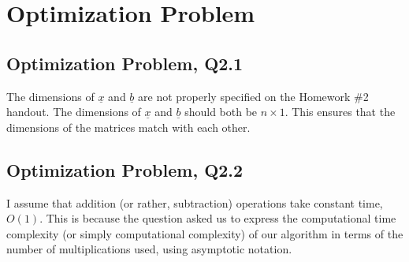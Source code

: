 \documentclass[letter,12pt]{article}
\begin{document}
\section{Optimization Problem}
\label{sec:optimizationproblem}

\subsection{Optimization Problem, Q2.1}
\label{ssec:q2a}

The dimensions of $\underline{x}$ and $\underline{b}$ are not properly specified on the Homework \#2 handout. The dimensions of $\underline{x}$ and $\underline{b}$ should both be $n \times 1$. This ensures that the dimensions of the matrices match with each other. \\



\subsection{Optimization Problem, Q2.2}
\label{ssec:q2b}

I assume that addition (or rather, subtraction) operations take constant time, $O(1)$. This is because the question asked us to express the computational time complexity (or simply computational complexity) of our algorithm in terms of the number of multiplications used, using asymptotic notation.






{\linespread{1}


}
\end{document}

